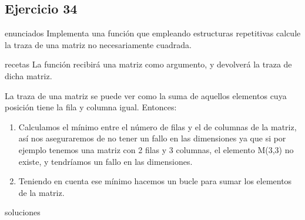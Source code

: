 \subsection{Ejercicio 34}
\def\parte{enunciados}
\ifx\capitulo\parte
Implementa una función que empleando estructuras repetitivas calcule la traza de una matriz no necesariamente cuadrada.
\fi

\def\parte{recetas}
\ifx\capitulo\parte
La función recibirá una matriz como argumento, y devolverá la traza de dicha matriz.

La traza de una matriz se puede ver como la suma de aquellos elementos cuya posición tiene la fila y columna igual. Entonces:
\begin{enumerate}
\item Calculamos el mínimo entre el número de filas y el de columnas de la matriz, así nos aseguraremos de no tener un fallo en las dimensiones ya que si por ejemplo tenemos una matriz con 2 filas y 3 columnas, el elemento M(3,3) no existe, y tendríamos un fallo en las dimensiones.
\item Teniendo en cuenta ese mínimo hacemos un bucle para sumar los elementos  de la matriz.
\end{enumerate}
\fi

\def\parte{soluciones}
\ifx\capitulo\parte

\fi

